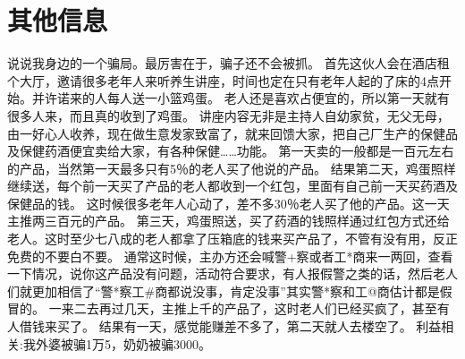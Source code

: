 \documentclass[10pt]{article} %
\begin{document}
\section{其他信息}

说说我身边的一个骗局。最厉害在于，骗子还不会被抓。
首先这伙人会在酒店租个大厅，邀请很多老年人来听养生讲座，时间也定在只有老年人起的了床的4点开始。并许诺来的人每人送一小篮鸡蛋。
老人还是喜欢占便宜的，所以第一天就有很多人来，而且真的收到了鸡蛋。
讲座内容无非是主持人自幼家贫，无父无母，由一好心人收养，现在做生意发家致富了，就来回馈大家，把自己厂生产的保健品及保健药酒便宜卖给大家，有各种保健……功能。
第一天卖的一般都是一百元左右的产品，当然第一天最多只有5％的老人买了他说的产品。
结果第二天，鸡蛋照样继续送，每个前一天买了产品的老人都收到一个红包，里面有自己前一天买药酒及保健品的钱。
这时候很多老年人心动了，差不多30％老人买了他的产品。这一天主推两三百元的产品。
第三天，鸡蛋照送，买了药酒的钱照样通过红包方式还给老人。这时至少七八成的老人都拿了压箱底的钱来买产品了，不管有没有用，反正免费的不要白不要。
通常这时候，主办方还会喊警+察或者工*商来一两回，查看一下情况，说你这产品没有问题，活动符合要求，有人报假警之类的话，然后老人们就更加相信了“警*察工\#商都说没事，肯定没事”其实警*察和工@商估计都是假冒的。
一来二去再过几天，主推上千的产品了，这时老人们已经买疯了，甚至有人借钱来买了。
结果有一天，感觉能赚差不多了，第二天就人去楼空了。
利益相关:我外婆被骗1万5，奶奶被骗3000。
\end{document}
